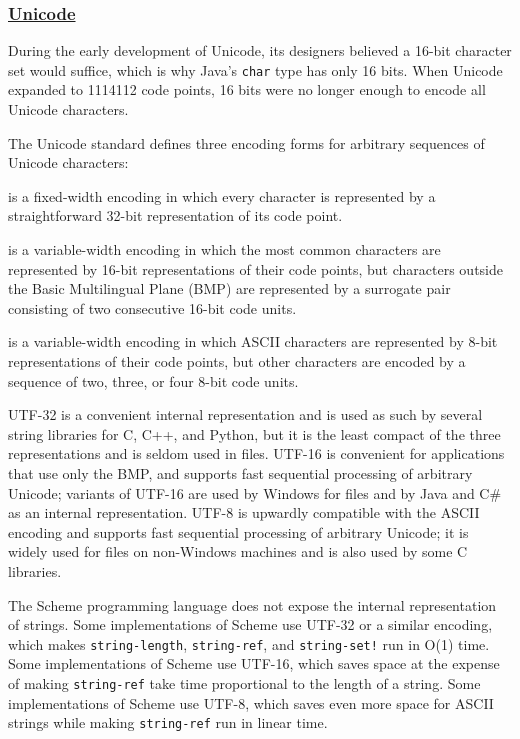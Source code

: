 \subsubsection{\texorpdfstring{\href{}{Unicode}}{Unicode}}\label{unicode}

During the early development of Unicode, its designers believed a 16-bit
character set would suffice, which is why Java's \texttt{char} type has
only 16 bits. When Unicode expanded to 1114112 code points, 16 bits were
no longer enough to encode all Unicode characters.

The Unicode standard defines three encoding forms for arbitrary
sequences of Unicode characters:

\begin{description}
\tightlist
\item[ UTF-32 ]
is a fixed-width encoding in which every character is represented by a
straightforward 32-bit representation of its code point.
\item[ UTF-16 ]
is a variable-width encoding in which the most common characters are
represented by 16-bit representations of their code points, but
characters outside the Basic Multilingual Plane (BMP) are represented by
a surrogate pair consisting of two consecutive 16-bit code units.
\item[ UTF-8 ]
is a variable-width encoding in which ASCII characters are represented
by 8-bit representations of their code points, but other characters are
encoded by a sequence of two, three, or four 8-bit code units.
\end{description}

UTF-32 is a convenient internal representation and is used as such by
several string libraries for C, C++, and Python, but it is the least
compact of the three representations and is seldom used in files. UTF-16
is convenient for applications that use only the BMP, and supports fast
sequential processing of arbitrary Unicode; variants of UTF-16 are used
by Windows for files and by Java and C\# as an internal representation.
UTF-8 is upwardly compatible with the ASCII encoding and supports fast
sequential processing of arbitrary Unicode; it is widely used for files
on non-Windows machines and is also used by some C libraries.

The Scheme programming language does not expose the internal
representation of strings. Some implementations of Scheme use UTF-32 or
a similar encoding, which makes \texttt{string-length},
\texttt{string-ref}, and \texttt{string-set!} run in O(1) time. Some
implementations of Scheme use UTF-16, which saves space at the expense
of making \texttt{string-ref} take time proportional to the length of a
string. Some implementations of Scheme use UTF-8, which saves even more
space for ASCII strings while making \texttt{string-ref} run in linear
time.

